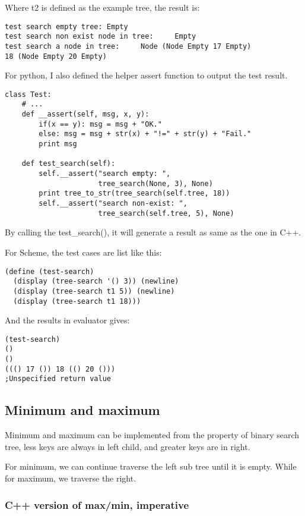 \documentclass{article}
\begin{document}
Where t2 is defined as the example tree, the result is:
\begin{verbatim}
test search empty tree: Empty
test search non exist node in tree:     Empty
test search a node in tree:     Node (Node Empty 17 Empty) 
18 (Node Empty 20 Empty)
\end{verbatim}

For python, I also defined the helper assert function to output the test
result.

\lstset{language=Python}
\begin{lstlisting}
class Test:
    # ...
    def __assert(self, msg, x, y):
        if(x == y): msg = msg + "OK."
        else: msg = msg + str(x) + "!=" + str(y) + "Fail."
        print msg

    def test_search(self):
        self.__assert("search empty: ", 
                      tree_search(None, 3), None)
        print tree_to_str(tree_search(self.tree, 18))
        self.__assert("search non-exist: ", 
                      tree_search(self.tree, 5), None)
\end{lstlisting}

By calling the test\_search(), it will generate a result as same as the one
in C++.

For Scheme, the test cases are list like this:

\lstset{language=lisp}
\begin{lstlisting}
(define (test-search)
  (display (tree-search '() 3)) (newline)
  (display (tree-search t1 5)) (newline)
  (display (tree-search t1 18)))
\end{lstlisting}

And the results in evaluator gives:

\begin{verbatim}
(test-search)
()
()
((() 17 ()) 18 (() 20 ()))
;Unspecified return value
\end{verbatim}

\subsection{Minimum and maximum}

Minimum and maximum can be implemented from the property of binary search
tree, less keys are always in left child, and greater keys are in right.

For minimum, we can continue traverse the left sub tree until it is empty.
While for maximum, we traverse the right.

\subsubsection*{C++ version of max/min, imperative}
\end{document}
